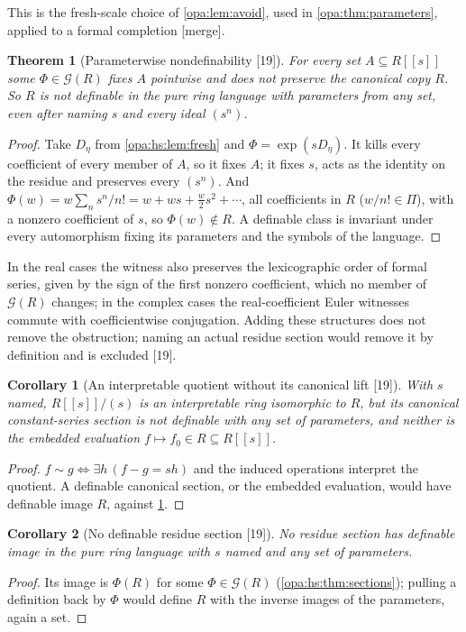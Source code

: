 \documentclass[11pt,oneside]{article}
\numberwithin{equation}{section}
\newtheorem{theorem}{Theorem}[section]
\newtheorem{corollary}[corollary]{Corollary}
\theoremstyle{definition}
\theoremstyle{remark}
\newcommand{\src}[1]{\textup{\textsf{\small[#1]}}}
\newcommand{\mergetag}{\textup{\textsf{\small[merge]}}}
\begin{document}
This is the fresh-scale choice of \cref{opa:lem:avoid}, used in \cref{opa:thm:parameters}, applied to a formal completion \mergetag.

\begin{theorem}[Parameterwise nondefinability \src{19}]\label{opa:hs:thm:nondef}
For every set $A\subseteq R[[s]]$ some $\Phi\in\mathcal G(R)$ fixes $A$ pointwise and does not preserve the canonical copy $R$. So $R$ is not definable in the pure
ring language with parameters from any set, even after naming $s$ and every ideal $(s^n)$.
\end{theorem}
\begin{proof}
Take $D_\eta$ from \cref{opa:hs:lem:fresh} and $\Phi=\exp(sD_\eta)$. It kills every coefficient of every member of $A$, so it fixes $A$; it fixes $s$, acts as the
identity on the residue and preserves every $(s^n)$. And $\Phi(w)=w\sum_ns^n/n!=w+ws+\frac w2s^2+\cdots$, all coefficients in $R$ ($w/n!\in\Pi$), with a nonzero
coefficient of $s$, so $\Phi(w)\notin R$. A definable class is invariant under every automorphism fixing its parameters and the symbols of the language.
\end{proof}

In the real cases the witness also preserves the lexicographic order of formal series, given by the sign of the first nonzero coefficient, which no member
of $\mathcal G(R)$ changes; in the complex cases the real-coefficient Euler witnesses commute with coefficientwise conjugation. Adding these structures does not
remove the obstruction; naming an actual residue section would remove it by definition and is excluded \src{19}.

\begin{corollary}[An interpretable quotient without its canonical lift \src{19}]\label{opa:hs:cor:residue}
With $s$ named, $R[[s]]/(s)$ is an interpretable ring isomorphic to $R$, but its canonical constant-series section is not definable with any set of
parameters, and neither is the embedded evaluation $f\mapsto f_0\in R\subseteq R[[s]]$.
\end{corollary}
\begin{proof}
$f\sim g\iff\exists h\,(f-g=sh)$ and the induced operations interpret the quotient. A definable canonical section, or the embedded evaluation, would have
definable image $R$, against \cref{opa:hs:thm:nondef}.
\end{proof}

\begin{corollary}[No definable residue section \src{19}]\label{opa:hs:cor:anysection}
No residue section has definable image in the pure ring language with $s$ named and any set of parameters.
\end{corollary}
\begin{proof}
Its image is $\Phi(R)$ for some $\Phi\in\mathcal G(R)$ (\cref{opa:hs:thm:sections}); pulling a definition back by $\Phi$ would define $R$ with the inverse images of the
parameters, again a set.
\end{proof}
\end{document}
